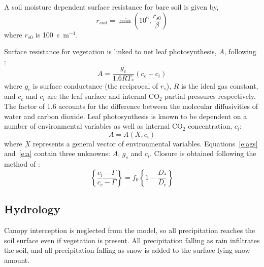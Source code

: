 \documentclass[a4paper]{article}
\begin{document}
A soil moisture dependent surface resistance for bare soil is given
by,
\begin{equation}
r_{soil} = \min{ \left( 10^6,\frac{r_{s0}}{\beta} \right) }
\label{e:rss}
\end{equation}
where $r_{s0}$ is 100~s~m$^{-1}$.

Surface resistance for vegetation is linked to net leaf
photosynthesis, $A$, following \citet{@@}:
\begin{equation}
  A = \frac{g_c}{1.6 R T_*}\left( c_c - c_i \right) \label{e:ags}
\end{equation}
where $g_c$ is surface conductance (the reciprocal of $r_s$), $R$ is
the ideal gas constant, and $c_c$ and $c_i$ are the leaf surface and
internal CO$_2$ partial pressures respectively.  The factor of 1.6
accounts for the difference between the molecular diffusivities of
water and carbon dioxide.  Leaf photosynthesis is known to be
dependent on a number of environmental variables as well as internal
CO$_2$ concentration, $c_i$:
\begin{equation}
  A = A\left(\underbar{X}, c_i\right) \label{e:a}
\end{equation}
where $\underbar{X}$ represents a general vector of environmental
variables.  Equations~\eqref{e:ags} and~\eqref{e:a} contain three
unknowns: $A$, $g_s$ and $c_i$.  Closure is obtained following the
method of \citet{Jac94}:
\begin{equation}
  \left\{ \frac{c_i - \Gamma}{c_c - \Gamma} \right\} = f_0
  \left\{ 1-\frac{D_*}{D_c}\right\}
\label{e:jac}
\end{equation}

\subsection{Hydrology}\label{s:surf.hyd}
Canopy interception is neglected from the model, so all precipitation
reaches the soil surface even if vegetation is present.  All
precipitation falling as rain infiltrates the soil, and all
precipitation falling as snow is added to the surface lying snow
amount.
\end{document}
